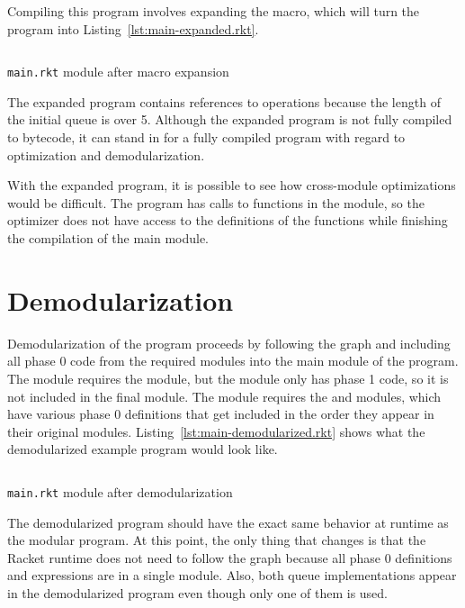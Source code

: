 Compiling this program involves expanding the  macro, which will turn the program into Listing~\ref{lst:main-expanded.rkt}.

\begin{listing}
  \inputminted{racket}{listings/main-expanded.rkt}
  \caption{\texttt{main.rkt} module after macro expansion}
  \label{lst:main-expanded.rkt}
\end{listing}

The expanded program contains references to  operations because the length of the initial queue is over 5.
Although the expanded program is not fully compiled to bytecode, it can stand in for a fully compiled program with regard to optimization and demodularization.

With the expanded program, it is possible to see how cross-module optimizations would be difficult.
The program has calls to functions in the  module, so the optimizer does not have access to the definitions of the functions while finishing the compilation of the main module.

\section{Demodularization}

Demodularization of the program proceeds by following the  graph and including all phase 0 code from the required modules into the main module of the program. 
The  module requires the  module, but the  module only has phase 1 code, so it is not included in the final module.
The  module requires the  and  modules, which have various phase 0 definitions that get included in the order they appear in their original modules.
Listing~\ref{lst:main-demodularized.rkt} shows what the demodularized example program would look like.

\begin{listing}
  \inputminted{racket}{listings/main-demodularized.rkt}
  \caption{\texttt{main.rkt} module after demodularization}
  \label{lst:main-demodularized.rkt}
\end{listing}

The demodularized program should have the exact same behavior at runtime as the modular program.
At this point, the only thing that changes is that the Racket runtime does not need to follow the  graph because all phase 0 definitions and expressions are in a single module.
Also, both queue implementations appear in the demodularized program even though only one of them is used.


